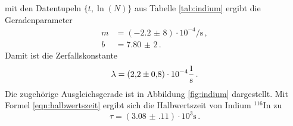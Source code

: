 mit den Datentupeln $\{ t, \ln (N)\}$ aus Tabelle \ref{tab:indium} ergibt die Geradenparameter
\begin{align*}
	m &= (-\num{2,2(8)}) \cdot 10^{-4} \si{\per\second}  \, \mathrm{,} \\
	b &= \num{7,80(2)} \, \mathrm{.}
\end{align*}
Damit ist die Zerfallskonstante
\begin{equation*}
	\lambda = (\num{2,2(8)}) \cdot 10^{-4} \si{\per\second}  \, \mathrm{.} \\
\end{equation*}
Die zugehörige Ausgleichsgerade ist in Abbildung \ref{fig:indium} dargestellt.
Mit Formel \eqref{eqn:halbwertszeit} ergibt sich die Halbwertszeit von Indium $^{116}\mathrm{In}$
zu
\begin{equation*}
	\tau =  (\num{3.08(11)}) \cdot 10^3 \si{\second} \, \mathrm{.}
\end{equation*}


















%
%
%
%



